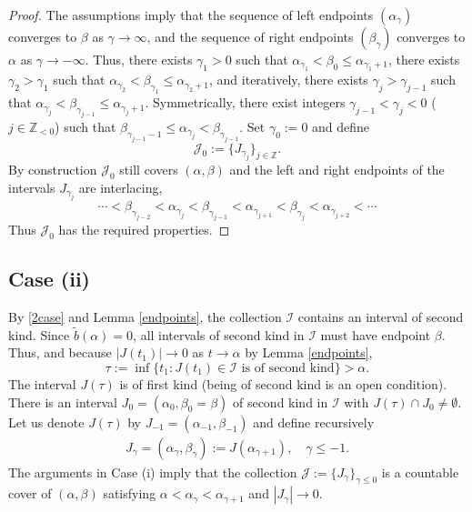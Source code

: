 \documentclass[12pt]{amsart}
\theoremstyle{plain}
\theoremstyle{definition}
\numberwithin{equation}{section}
\begin{document}
\begin{proof}
  The assumptions imply that the sequence of left endpoints $({\alpha}_{\gamma})$ converges to ${\beta}$ as ${\gamma} \to \infty$,
  and the sequence of right endpoints $({\beta}_{\gamma})$ converges to ${\alpha}$ as ${\gamma} \to -\infty$. 
  Thus, there exists ${\gamma}_1 > 0$ such that ${\alpha}_{{\gamma}_1} < {\beta}_0 \le {\alpha}_{{\gamma}_1 + 1}$, 
  there exists ${\gamma}_2 > {\gamma}_1$ such that ${\alpha}_{{\gamma}_2} < {\beta}_{{\gamma}_1} \le {\alpha}_{{\gamma}_2 + 1}$, and iteratively, 
  there exists ${\gamma}_j > {\gamma}_{j-1}$ such that ${\alpha}_{{\gamma}_j} < {\beta}_{{\gamma}_{j-1}} \le {\alpha}_{{\gamma}_j + 1}$. 
  Symmetrically,  
  there exist integers ${\gamma}_{j-1} < {\gamma}_{j} < 0$ ($j \in {\mathbb{Z}}_{<0}$) such that ${\beta}_{{\gamma}_{j-1}-1} \le {\alpha}_{{\gamma}_j} < {\beta}_{{\gamma}_{j-1}}$.
  Set ${\gamma}_0 := 0$ and define 
  \[
    {\mathcal{J}}_0 := \{J_{{\gamma}_j}\}_{j \in {\mathbb{Z}}}.
  \]
  By construction ${\mathcal{J}}_0$ still covers $({\alpha},{\beta})$ and the left and right endpoints of the intervals $J_{{\gamma}_j}$ are interlacing,
  \[
    \cdots < {\beta}_{{\gamma}_{j-2}}< {\alpha}_{{\gamma}_j} < {\beta}_{{\gamma}_{j-1}} < {\alpha}_{{\gamma}_{j+1}} < {\beta}_{{\gamma}_{j}} < {\alpha}_{{\gamma}_{j+2}} < \cdots 
  \]
  Thus ${\mathcal{J}}_0$ has the required properties.
\end{proof}

\subsection*{Case (ii)} By \eqref{2case} and Lemma \ref{endpoints}, the collection ${\mathcal{I}}$ contains an interval of second kind. 
  Since $\tilde b({\alpha}) = 0$, all intervals of second kind in ${\mathcal{I}}$ must have endpoint ${\beta}$. 
  Thus, and because $|J(t_1)| \to 0$ as $t\to {\alpha}$ by Lemma \ref{endpoints},  
  \[
    {\tau} := \inf\{t_1 : J(t_1) \in {\mathcal{I}} \text{ is of second kind}\} > {\alpha}.
  \] 
  The interval $J({\tau})$ is of first kind (being of second kind is an open condition).  
  There is an interval $J_0 = ({\alpha}_0,{\beta}_0={\beta})$ of second kind in ${\mathcal{I}}$ with $J({\tau}) \cap J_0 \ne \emptyset$. 
  Let us denote $J({\tau})$ by $J_{-1} = ({\alpha}_{-1},{\beta}_{-1})$ and define recursively  
  \begin{align*}
    J_{\gamma} = ({\alpha}_{\gamma},{\beta}_{\gamma}) := 
      J({\alpha}_{{\gamma}+1}), \quad {\gamma} \le -1. 
  \end{align*} 
  The arguments in Case (i) imply that the collection ${\mathcal{J}}:= \{J_{\gamma}\}_{{\gamma} \le 0}$ is a countable cover of $({\alpha},{\beta})$ 
  satisfying ${\alpha} < {\alpha}_{\gamma} < {\alpha}_{{\gamma}+1}$ and $|J_{\gamma}| \to 0$.
\end{document}
